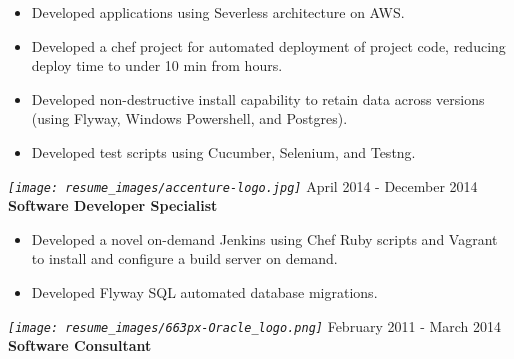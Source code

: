 \documentclass[12pt, line, margin]{res}
\begin{document}
\begin{resume}
\begin{itemize}  [nolistsep, noitemsep, topsep=0px, parsep=0px, partopsep=0px]
              \item   Developed applications using Severless architecture on AWS.
              \item   Developed a chef project for automated deployment of project \newline
                          code, reducing deploy time to under 10 min from hours.
              \item   Developed non-destructive install capability to retain data across\newline
                          versions (using Flyway, Windows Powershell, and Postgres).
              \item   Developed test scripts using Cucumber, Selenium, and Testng.
            \end{itemize}


            {\sl
              \texttt{[image: resume\_images/accenture-logo.jpg]}
            }
            \hfill April 2014 - December 2014 \\
            \textbf{Software Developer Specialist}
            \begin{itemize}  \itemsep -2pt %
              \item   Developed a novel on-demand Jenkins using Chef Ruby scripts 
                          and Vagrant to install and configure a build server on demand.
              \item   Developed Flyway SQL automated database migrations.
            \end{itemize}

            {\sl
              \texttt{[image: resume\_images/663px-Oracle\_logo.png]}
            }
            \hfill            February 2011 - March 2014 \\
            \textbf{Software Consultant}
       \vspace{-4mm} %

\end{resume}
\end{document}
